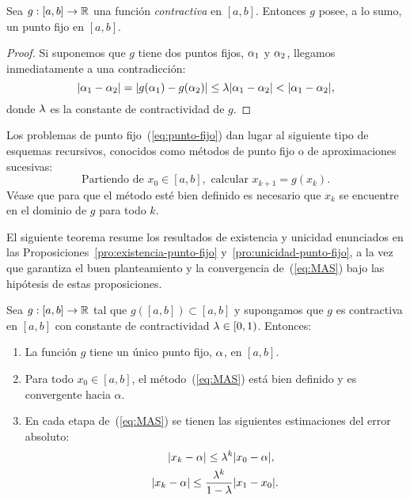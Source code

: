 \begin{proposition}
  \label{pro:unicidad-punto-fijo}
  Sea $g:[a,b]\to\operatorname{{\mathbb R}}$ una función \emph{contractiva} en
  $[a,b]$. Entonces $g$ posee, a lo sumo, un punto fijo en $[a,b]$.
\end{proposition}

\begin{proof}
  Si suponemos que $g$ tiene dos puntos fijos, $\alpha_1$ y
  $\alpha_2$, llegamos inmediatamente a una contradicción:
  $$
  |\alpha_1-\alpha_2| = |g(\alpha_1)-g(\alpha_2)| \le \lambda |\alpha_1 -
  \alpha_2| < |\alpha_1-\alpha_2|,$$
  donde $\lambda$ es la constante de contractividad de $g$.
\end{proof}

Los problemas de punto fijo~(\ref{eq:punto-fijo}) dan lugar al
siguiente tipo de esquemas recursivos, conocidos como métodos de punto
fijo o de aproximaciones sucesivas:
\begin{equation}
  \tag{MAS}
  \text{Partiendo de } x_0\in [a,b], \text{ calcular } x_{k+1}=g(x_k).
  \label{eq:MAS}
\end{equation}
Véase que para que el método esté bien definido es necesario
que $x_k$ se encuentre en el dominio de $g$ para todo $k$.

El siguiente teorema resume los resultados de existencia y unicidad
enunciados en las Proposiciones~\ref{pro:existencia-punto-fijo}
y~\ref{pro:unicidad-punto-fijo}, a la vez que garantiza el buen
planteamiento y la convergencia de~(\ref{eq:MAS}) bajo las hipótesis
de estas proposiciones.

\begin{theorem}
  \label{thm:punto-fijo-Banach}
  Sea $g:[a,b]\to\operatorname{{\mathbb R}}$ tal que $g([a,b]) \subset [a,b]$ y supongamos
  que $g$ es contractiva en $[a,b]$ con constante de contractividad
  $\lambda\in [0,1)$. Entonces:
  \begin{enumerate}
  \item 
    \label{item:punto-fijo-Banach:1}
    La función $g$ tiene un \textsf{único punto fijo}, $\alpha$, en
    $[a,b]$.
  \item 
    \label{item:punto-fijo-Banach:2}
    Para todo $x_0\in [a,b]$, el método~(\ref{eq:MAS}) está bien
    definido y es \textsf{convergente} hacia $\alpha$.
  \item En cada etapa de~(\ref{eq:MAS}) se tienen las siguientes
    \textsf{estimaciones} del error absoluto:
    \label{item:punto-fijo-Banach:3}
    \begin{align}
      \label{eq:pto-fijo:cota-a-priori}
      |x_k-\alpha| \le \lambda^k &|x_0-\alpha|,
      \\
      \label{eq:pto-fijo:cota-a-posteriori}
      |x_k-\alpha| \le \frac{\lambda^k}{1-\lambda}
      &|x_1-x_0|.
    \end{align}
  \end{enumerate}
\end{theorem}

